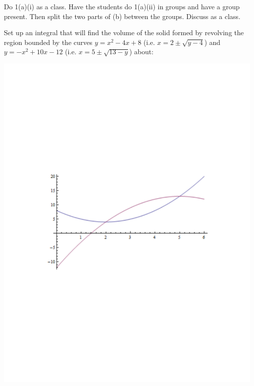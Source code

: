 \documentclass[noinstructornotes]{ximera}
\begin{document}
\begin{problem}
\begin{enumerate}
\begin{freeResponse}
\begin{enumerate}
			\end{enumerate}
		\end{freeResponse}
	\end{enumerate}
	
\end{problem}

\begin{instructorNotes}
Do 1(a)(i) as a class.  
Have the students do 1(a)(ii) in groups and have a group present.  
Then split the two parts of (b) between the groups.  
Discuss as a class. 
\end{instructorNotes}







\begin{problem}
Set up an integral that will find the volume of the solid formed by revolving the region bounded by the curves $y=x^2-4x+8$ (i.e. $x = 2 \pm \sqrt{y-4}$) and $y=-x^2+10x-12$ (i.e. $x = 5 \pm \sqrt{13-y}$) about:

\begin{image}
\includegraphics[trim= 240 280 200 270, scale=0.5]{Figure6-3-1.pdf}
\end{image}
	

\end{problem}
\end{document}
